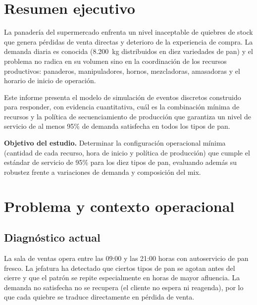 \documentclass[12pt]{article}
\begin{document}
\tableofcontents

\newpage
\section{Resumen ejecutivo}

La panadería del supermercado enfrenta un nivel inaceptable de quiebres de stock que genera pérdidas de venta directas y deterioro de la experiencia de compra. La demanda diaria es conocida (8.200~kg distribuidos en diez variedades de pan) y el problema no radica en su volumen sino en la coordinación de los recursos productivos: panaderos, manipuladores, hornos, mezcladoras, amasadoras y el horario de inicio de operación.

Este informe presenta el modelo de simulación de eventos discretos construido para responder, con evidencia cuantitativa, cuál es la combinación mínima de recursos y la política de secuenciamiento de producción que garantiza un nivel de servicio de al menos 95\% de demanda satisfecha en todos los tipos de pan.

\medskip
\noindent\textbf{Objetivo del estudio.} Determinar la configuración operacional mínima (cantidad de cada recurso, hora de inicio y política de producción) que cumple el estándar de servicio de 95\% para los diez tipos de pan, evaluando además su robustez frente a variaciones de demanda y composición del mix.

\newpage
\section{Problema y contexto operacional}

\subsection{Diagnóstico actual}

La sala de ventas opera entre las 09:00 y las 21:00 horas con autoservicio de pan fresco. La jefatura ha detectado que ciertos tipos de pan se agotan antes del cierre y que el patrón se repite especialmente en horas de mayor afluencia. La demanda no satisfecha no se recupera (el cliente no espera ni reagenda), por lo que cada quiebre se traduce directamente en pérdida de venta.
\end{document}
